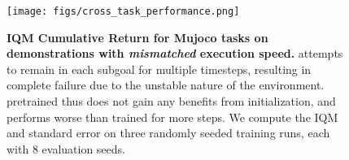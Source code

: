 \begin{figure}[t]
    \centering
    \texttt{[image: figs/cross\_task\_performance.png]}
    \caption{\small \textbf{IQM Cumulative Return for Mujoco tasks on demonstrations with \textit{mismatched} execution speed.} \tot{} attempts to remain in each subgoal for multiple timesteps, resulting in complete failure due to the unstable nature of the environment. \ours{} pretrained thus does not gain any benefits from initialization, and performs worse than \ours{} trained for more steps. We compute the IQM and standard error on three randomly seeded training runs, each with 8 evaluation seeds. 
    }
    \label{fig:mujoco_iqm}
\end{figure}
